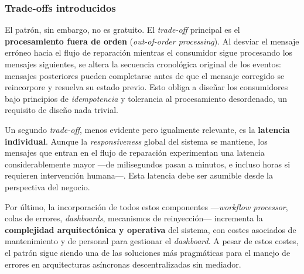 \subsubsection{Trade-offs introducidos}

El patrón, sin embargo, no es gratuito. El \emph{trade-off} principal es el
\textbf{procesamiento fuera de orden} (\emph{out-of-order processing}). Al desviar el
mensaje erróneo hacia el flujo de reparación mientras el consumidor sigue
procesando los mensajes siguientes, se altera la secuencia cronológica original de
los eventos: mensajes posteriores pueden completarse antes de que el mensaje
corregido se reincorpore y resuelva su estado previo. Esto obliga a diseñar los
consumidores bajo principios de \emph{idempotencia} y tolerancia al procesamiento
desordenado, un requisito de diseño nada trivial.

Un segundo \emph{trade-off}, menos evidente pero igualmente relevante, es la
\textbf{latencia individual}. Aunque la \emph{responsiveness} global del sistema se
mantiene, los mensajes que entran en el flujo de reparación experimentan una
latencia considerablemente mayor ---de milisegundos pasan a minutos, e incluso horas
si requieren intervención humana---. Esta latencia debe ser asumible desde la
perspectiva del negocio.

Por último, la incorporación de todos estos componentes ---\emph{workflow processor},
colas de errores, \emph{dashboards}, mecanismos de reinyección--- incrementa la
\textbf{complejidad arquitectónica y operativa} del sistema, con costes asociados de
mantenimiento y de personal para gestionar el \emph{dashboard}. A pesar de estos
costes, el patrón sigue siendo una de las soluciones más pragmáticas para el manejo
de errores en arquitecturas asíncronas descentralizadas sin mediador.
